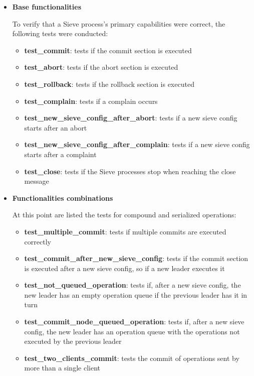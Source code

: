 \documentclass{scrartcl}
\begin{document}
\begin{itemize}
    \item \textbf{Base functionalities}

        To verify that a Sieve process's primary capabilities were correct, the following tests were conducted:
        \begin{itemize}
            \item \textbf{test\_commit}: tests if the commit section is executed
            \item \textbf{test\_abort}: tests if the abort section is executed
            \item \textbf{test\_rollback}: tests if the rollback section is executed
            \item \textbf{test\_complain}: tests if a complain occurs
            \item \textbf{test\_new\_sieve\_config\_after\_abort}: tests if a new sieve config starts after an abort
            \item \textbf{test\_new\_sieve\_config\_after\_complain}: tests if a new sieve config starts after a complaint
            \item \textbf{test\_close}: tests if the Sieve processes stop when reaching the close message
        \end{itemize}

    \item \textbf{Functionalities combinations}
    
        At this point are listed the tests for compound and serialized operations:
        \begin{itemize}
            \item \textbf{test\_multiple\_commit}: tests if multiple commits are executed correctly
            \item \textbf{test\_commit\_after\_new\_sieve\_config}: tests if the commit section is executed after a new sieve config, so if a new leader executes it
            \item \textbf{test\_not\_queued\_operation}: tests if, after a new sieve config, the new leader has an empty operation queue if the previous leader has it in turn
            \item \textbf{test\_commit\_node\_queued\_operation}: tests if, after a new sieve config, the new leader has an operation queue with the operations not executed by the previous leader
            \item \textbf{test\_two\_clients\_commit}: tests the commit of operations sent by more than a single client
        \end{itemize}


\end{itemize}
\end{document}
